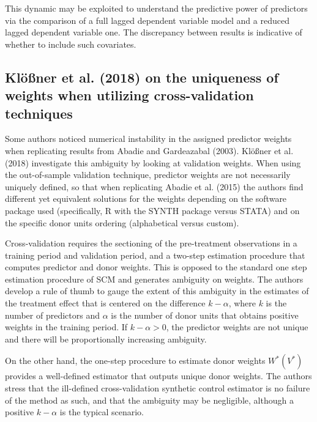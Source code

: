 \documentclass[12pt,a4paper,draft]{article}
\begin{document}
This dynamic may be exploited to understand the predictive power of predictors via the 
comparison of a full lagged dependent variable model and a reduced lagged dependent 
variable one. The discrepancy between results is indicative of whether to include 
such covariates.





\subsection{Klößner et al. (2018) on the uniqueness of weights 
when utilizing cross-validation techniques}

Some authors noticed numerical instability in the assigned predictor weights 
when replicating results from Abadie and Gardeazabal (2003). 
Klößner et al. (2018) investigate this ambiguity by looking at validation weights. 
When using the out-of-sample validation technique, 
predictor weights are not necessarily uniquely defined, so that when replicating 
Abadie et al. (2015) the authors find different yet equivalent solutions 
for the weights depending on the software package used (specifically, R with 
the SYNTH package versus STATA) and on the specific donor units ordering (alphabetical 
versus custom).

Cross-validation requires the sectioning of the pre-treatment observations 
in a training period and validation period, and a two-step estimation procedure 
that computes predictor and donor weights. This is opposed to the standard 
one step estimation procedure of SCM and generates ambiguity on weights. 
The authors develop a rule of thumb to gauge the extent of this ambiguity 
in the estimates of the treatment effect that is centered on the difference 
$k-\alpha$, where $k$ is the number of predictors and $\alpha$ is the number of 
donor units that obtains positive weights in the training period.
If $k-\alpha>0$, the predictor weights are not unique and there will be 
proportionally increasing ambiguity.

On the other hand, the one-step procedure to estimate donor weights $W^*(V^*)$ 
provides a well-defined estimator that outputs unique donor weights. The authors 
stress that the ill-defined cross-validation synthetic control estimator is no 
failure of the method as such, and that the ambiguity may be negligible, although 
a positive $k-\alpha$ is the typical scenario.
\end{document}
